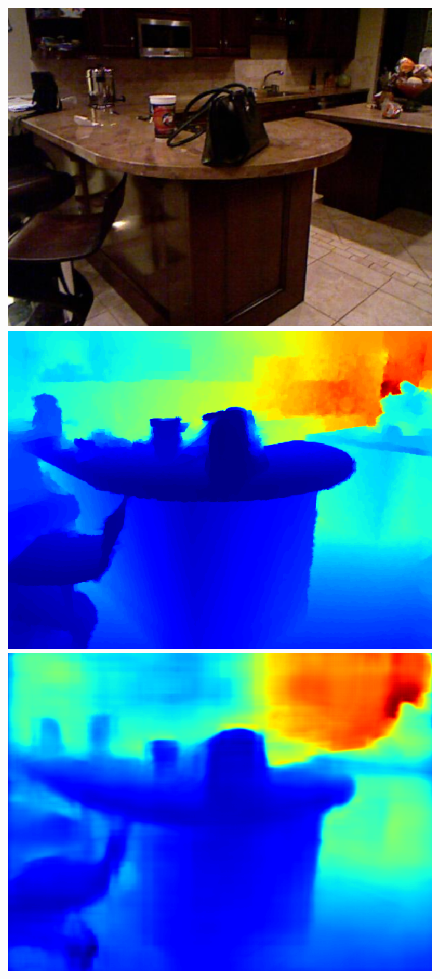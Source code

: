 \documentclass{svjour3}                     %
\begin{document}
\begin{figure}[t]
{\begin{minipage}[t]{0.15\linewidth}
  \includegraphics[width=1\linewidth]{images/nyu_rgb/850.png}
  \includegraphics[width=1\linewidth]{images/nyu_gt/850.png}
  \includegraphics[width=1\linewidth]{images/nyu_result/kitchen_rgb_00850.png}

\end{minipage}}
\end{figure}
\end{document}
